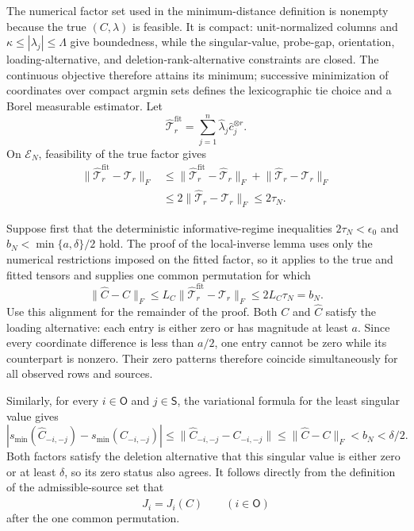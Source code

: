 The numerical factor set used in the minimum-distance definition is nonempty because the true \((C,\lambda)\) is feasible. It is compact: unit-normalized columns and \(\kappa\le|\lambda_j|\le\Lambda\) give boundedness, while the singular-value, probe-gap, orientation, loading-alternative, and deletion-rank-alternative constraints are closed. The continuous objective therefore attains its minimum; successive minimization of coordinates over compact argmin sets defines the lexicographic tie choice and a Borel measurable estimator. Let
\[
 \widehat{\mathcal T}^{\mathrm{fit}}_r
 =\sum_{j=1}^n\widehat\lambda_j\widehat c_j^{\otimes r}.
\]
On \(\mathcal E_N\), feasibility of the true factor gives
\[
 \begin{aligned}
 \lVert\widehat{\mathcal T}^{\mathrm{fit}}_r-\mathcal T_r\rVert_F
 &\le\lVert\widehat{\mathcal T}^{\mathrm{fit}}_r-\widehat{\mathcal T}_r\rVert_F
 +\lVert\widehat{\mathcal T}_r-\mathcal T_r\rVert_F\\
 &\le2\lVert\widehat{\mathcal T}_r-\mathcal T_r\rVert_F
 \le2\tau_N.
 \end{aligned}
\]

Suppose first that the deterministic informative-regime inequalities \(2\tau_N<\epsilon_0\) and \(b_N<\min\{a,\delta\}/2\) hold. The proof of the local-inverse lemma uses only the numerical restrictions imposed on the fitted factor, so it applies to the true and fitted tensors and supplies one common permutation for which
\[
 \lVert\widehat C-C\rVert_F
 \le L_C\lVert\widehat{\mathcal T}^{\mathrm{fit}}_r-\mathcal T_r\rVert_F
 \le2L_C\tau_N=b_N.
\]
Use this alignment for the remainder of the proof. Both \(C\) and \(\widehat C\) satisfy the loading alternative: each entry is either zero or has magnitude at least \(a\). Since every coordinate difference is less than \(a/2\), one entry cannot be zero while its counterpart is nonzero. Their zero patterns therefore coincide simultaneously for all observed rows and sources.

Similarly, for every \(i\in\mathsf O\) and \(j\in\mathsf S\), the variational formula for the least singular value gives
\[
 \left|s_{\min}(\widehat C_{-i,-j})-s_{\min}(C_{-i,-j})\right|
 \le\lVert\widehat C_{-i,-j}-C_{-i,-j}\rVert
 \le\lVert\widehat C-C\rVert_F<b_N<\delta/2.
\]
Both factors satisfy the deletion alternative that this singular value is either zero or at least \(\delta\), so its zero status also agrees. It follows directly from the definition of the admissible-source set that
\[
 \widehat J_i=J_i(C)\qquad(i\in\mathsf O)
\]
after the one common permutation.

